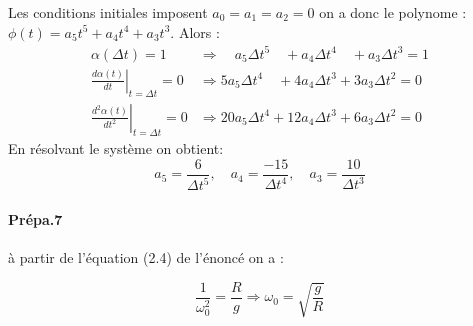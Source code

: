 \documentclass[10pt,a4paper,notitlepage]{article}
\begin{document}
Les conditions initiales imposent  $a_0=a_1=a_2 = 0$ on a donc le polynome : $ \phi(t) = a_5 t^5 + a_4 t^4 +a_3 t^3$.
Alors :
\begin{equation}
  \begin{aligned} \alpha(\Delta t)=1 & \Rightarrow \quad a_5 \Delta t^{5} \quad+a_4 \Delta t^{4} \quad+a_3 \Delta t^{3}=1 \\
    \left.\frac{d \alpha(t)}{d t}\right|_{t=\Delta t}=0 & \Rightarrow 5 a_5 \Delta t^{4} \quad+4 a_4 \Delta t^{3}+3 a_3 \Delta t^{2}=0 \\
    \left.\frac{d^{2} \alpha(t)}{d t^{2}}\right|_{t=\Delta t}=0 & \Rightarrow 20 a_5 \Delta t^{4}+12 a_4 \Delta t^{3}+6 a_3 \Delta t^{2}=0
  \end{aligned}
\end{equation}
En résolvant le système on obtient:
\[
  a_5 = \frac{6}{\Delta t^5} ,\quad a_4 = \frac{-15}{\Delta t^4}, \quad a_3 = \frac{10}{\Delta t^3}
\]

\paragraph{Prépa.7} à partir de l'équation (2.4) de l'énoncé on a :

\begin{equation}
  \frac{1}{\omega_{0}^{2}}=\frac{R}{g} \Rightarrow \omega_{0}=\sqrt{\frac{g}{R}}
\end{equation}
\end{document}
